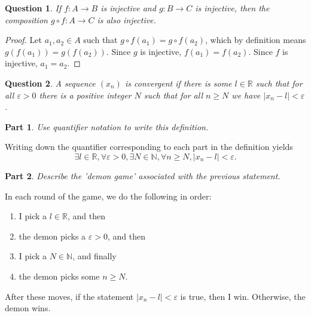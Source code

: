 \documentclass[12pt]{article}
\theoremstyle{customstyle}
\newtheorem{question}{Question}
\newtheorem{subquestion}{Part}[question]
\begin{document}
\begin{question}
    If $f: A \to B$ is injective and $g: B \to C$ is injective,
    then the composition $g \circ f : A \to C$ is also injective.
\end{question}
\begin{proof}
    Let $a_{1},a_{2} \in A$ such that $g \circ f(a_{1}) = g \circ f(a_{2})$,
    which by definition means $g(f(a_{1})) = g(f(a_{2}))$.
    Since $g$ is injective, $f(a_{1}) = f(a_{2})$.
    Since $f$ is injective, $a_{1} = a_{2}$.
\end{proof}

\begin{question}
    A sequence $(x_n)$ is \emph{convergent} if 
    there is some $l \in \mathbb{R}$ such that for all $\varepsilon > 0$
    there is a positive integer $N$ such that
    for all $n \ge N$ we have $|x_n - l| < \varepsilon $.
\end{question}

\begin{subquestion}
    Use quantifier notation to write this definition.
\end{subquestion}

Writing down the quantifier corresponding to each part in the definition yields
\[
\exists l\in \mathbb{R},\forall \varepsilon > 0,\exists N \in \mathbb{N},\forall n \ge N, |x_n - l| < \varepsilon.
\]
\begin{subquestion}
    Describe the 'demon game' associated with the previous statement.
\end{subquestion}

\noindent In each round of the game, we do the following in order:
\begin{enumerate}[noitemsep]
    \item I pick a $l \in \mathbb{R}$, and then
    \item the demon picks a $\varepsilon > 0$, and then
    \item I pick a $N \in \mathbb{N}$, and finally
    \item the demon picks some $n \ge N$.
\end{enumerate}
After these moves, if the statement $|x_n - l| < \varepsilon$ is true, 
then I win. Otherwise, the demon wins.
\end{document}
